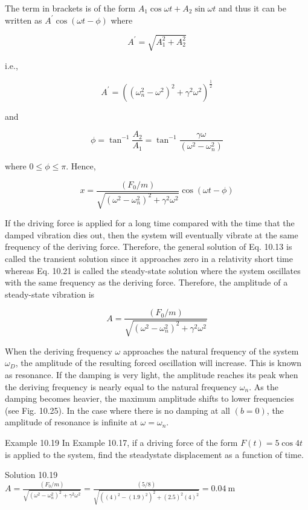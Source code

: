 \documentclass[10pt]{article}
\begin{document}
The term in brackets is of the form $A_{1} \cos \omega t+A_{2} \sin \omega t$ and thus it can be written as $A^{\prime} \cos (\omega t-\phi)$ where

$$
A^{\prime}=\sqrt{A_{1}^{2}+A_{2}^{2}}
$$

i.e.,

$$
A^{\prime}=\left(\left(\omega_{n}^{2}-\omega^{2}\right)^{2}+\gamma^{2} \omega^{2}\right)^{\frac{1}{2}}
$$

and

$$
\phi=\tan ^{-1} \frac{A_{2}}{A_{1}}=\tan ^{-1} \frac{\gamma \omega}{\left(\omega^{2}-\omega_{n}^{2}\right)}
$$

where $0 \leq \phi \leq \pi$. Hence,


\begin{equation*}
x=\frac{\left(F_{0} / m\right)}{\sqrt{\left(\omega^{2}-\omega_{n}^{2}\right)^{2}+\gamma^{2} \omega^{2}}} \cos (\omega t-\phi) \tag{10.22}
\end{equation*}


If the driving force is applied for a long time compared with the time that the damped vibration dies out, then the system will eventually vibrate at the same frequency of the deriving force. Therefore, the general solution of Eq. 10.13 is called the transient solution since it approaches zero in a relativity short time whereas Eq. 10.21 is called the steady-state solution where the system oscillates with the same frequency as the deriving force. Therefore, the amplitude of a steady-state vibration is

$$
A=\frac{\left(F_{0} / m\right)}{\sqrt{\left(\omega^{2}-\omega_{n}^{2}\right)^{2}+\gamma^{2} \omega^{2}}}
$$

When the deriving frequency $\omega$ approaches the natural frequency of the system $\omega_{D}$, the amplitude of the resulting forced oscillation will increase. This is known as resonance. If the damping is very light, the amplitude reaches its peak when the deriving frequency is nearly equal to the natural frequency $\omega_{n}$. As the damping becomes heavier, the maximum amplitude shifts to lower frequencies (see Fig. 10.25). In the case where there is no damping at all $(b=0)$, the amplitude of resonance is infinite at $\omega=\omega_{n}$.

Example 10.19 In Example 10.17, if a driving force of the form $F(t)=5 \cos 4 t$ is applied to the system, find the steadystate displacement as a function of time.

Solution 10.19\\
$A=\frac{\left(F_{0} / m\right)}{\sqrt{\left(\omega^{2}-\omega_{n}^{2}\right)^{2}+\gamma^{2} \omega^{2}}}=\frac{(5 / 8)}{\sqrt{\left((4)^{2}-(1.9)^{2}\right)^{2}+(2.5)^{2}(4)^{2}}}=0.04 \mathrm{~m}$
\end{document}
